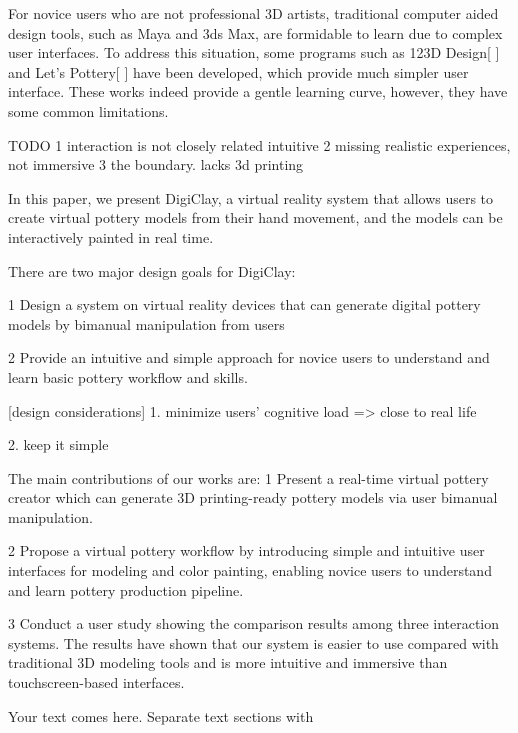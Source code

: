 For novice users who are not professional 3D artists, traditional computer aided design tools, such as Maya and 3ds Max, are formidable to learn due to complex user interfaces.
To address this situation, some programs such as 123D Design[ ] and Let’s Pottery[ ] have been developed, which provide much simpler user interface.
These works indeed provide a gentle learning curve, however, they have some common limitations.

TODO
1 interaction is not closely related intuitive 
2 missing realistic experiences, not immersive
3 the boundary. lacks 3d printing

In this paper, we present DigiClay, a virtual reality system that allows users to create virtual pottery models from their hand movement, and the models can be interactively painted in real time.

There are two major design goals for DigiClay:

1 Design a system on virtual reality devices that can generate digital pottery models by bimanual manipulation from users

2 Provide an intuitive and simple approach for novice users to understand and learn basic pottery workflow and skills.

[design considerations]
1. minimize users’ cognitive load => close to real life

2. keep it simple



The main contributions of our works are:
1 Present a real-time virtual pottery creator which can generate 3D printing-ready pottery models via user bimanual manipulation.

2 Propose a virtual pottery workflow by introducing simple and intuitive user interfaces for modeling and color painting, enabling novice users to understand and learn pottery production pipeline.

3 Conduct a user study showing the comparison results among three interaction systems. The results have shown that our system is easier to use compared with traditional 3D modeling tools and is more intuitive and immersive than touchscreen-based interfaces.
















Your text comes here. Separate text sections with




